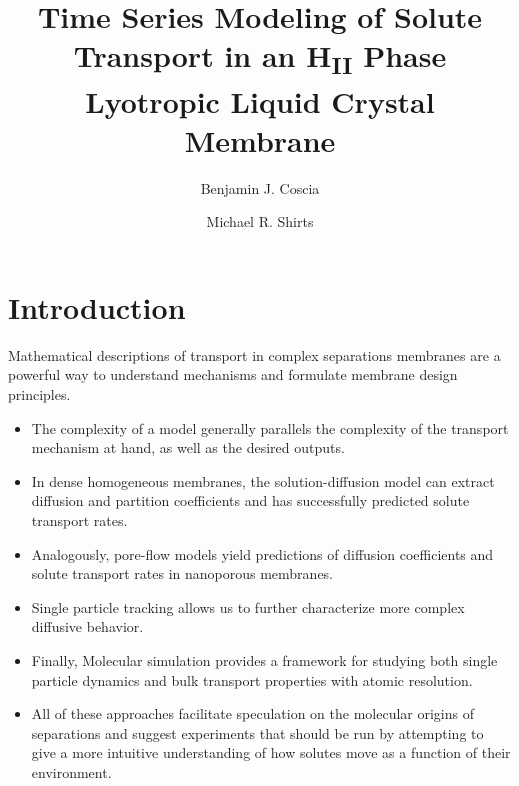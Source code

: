 \documentclass{article}
\title{Time Series Modeling of Solute Transport in an H\textsubscript{II} Phase Lyotropic Liquid Crystal Membrane}
\author{Benjamin J. Coscia \and Michael R. Shirts}
\begin{document}
  \graphicspath{{./figures/}}
  \maketitle

  \section{Introduction}

  Mathematical descriptions of transport in complex separations membranes are a powerful 
  way to understand mechanisms and formulate membrane design principles.
  \begin{itemize}
    \item The complexity of a model generally parallels the complexity of the 
    transport mechanism at hand, as well as the desired outputs.
    \item In dense homogeneous membranes, the solution-diffusion model can extract
    diffusion and partition coefficients and has successfully predicted solute transport
    rates.
    \item Analogously, pore-flow models yield predictions of diffusion coefficients
    and solute transport rates in nanoporous membranes.~\cite{wijmans_solution-diffusion_1995}
    \item Single particle tracking allows us to further characterize more complex
    diffusive behavior.
    \item Finally, Molecular simulation provides a framework for studying both single
    particle dynamics and bulk transport properties with atomic resolution.
    \item All of these approaches facilitate speculation on the molecular origins of
    separations and suggest experiments that should be run by attempting to give a more
    intuitive understanding of how solutes move as a function of their environment.
  \end{itemize}
\end{document}
